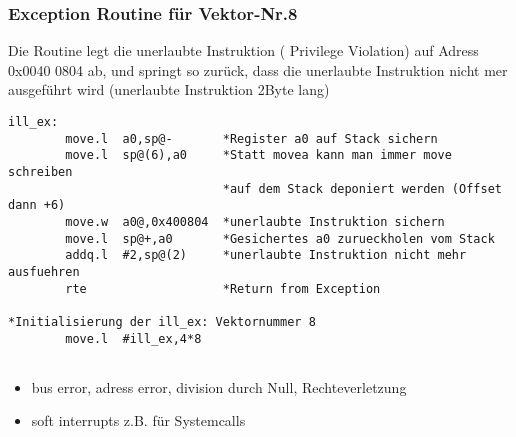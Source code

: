 \subsubsection{Exception Routine für Vektor-Nr.8}
Die Routine legt die unerlaubte Instruktion ( Privilege Violation) auf Adress
0x0040 0804 ab, und springt so zurück, dass die unerlaubte Instruktion nicht mer
ausgeführt wird (unerlaubte Instruktion 2Byte lang)
\begin{lstlisting}
ill_ex: 
        move.l  a0,sp@-       *Register a0 auf Stack sichern
        move.l  sp@(6),a0     *Statt movea kann man immer move schreiben
                              *auf dem Stack deponiert werden (Offset dann +6)
        move.w  a0@,0x400804  *unerlaubte Instruktion sichern
        move.l  sp@+,a0       *Gesichertes a0 zurueckholen vom Stack
        addq.l  #2,sp@(2)     *unerlaubte Instruktion nicht mehr ausfuehren
        rte                   *Return from Exception
        
*Initialisierung der ill_ex: Vektornummer 8
        move.l  #ill_ex,4*8
        
\end{lstlisting}
\begin{itemize}
  \item bus error, adress error, division durch Null, Rechteverletzung
  \item soft interrupts z.B. für Systemcalls
\end{itemize}

